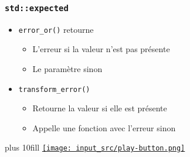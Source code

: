 \documentclass[C++.tex]{subfiles}
\begin{document}
\begin{frame}[fragile]
	\frametitle{\lstinline|std::expected|}
	\begin{itemize}
		\item \lstinline|error_or()| retourne
		\begin{itemize}
			\item L'erreur si la valeur n'est pas présente
			\item Le paramètre sinon
		\end{itemize}


		\item \lstinline|transform_error()|
		\begin{itemize}
			\item Retourne la valeur si elle est présente
			\item Appelle une fonction avec l'erreur sinon
		\end{itemize}
	\end{itemize}

	\vskip 10mm plus 10fill
	\hfill
	\href{https://godbolt.org/#z:OYLghAFBqd5QCxAYwPYBMCmBRdBLAF1QCcAaPECAMzwBtMA7AQwFtMQByARg9KtQYEAysib0QXACx8BBAKoBnTAAUAHpwAMvAFYTStJg1DIApACYAQuYukl9ZATwDKjdAGFUtAK4sGe1wAyeAyYAHI%2BAEaYxCCSAKykAA6oCoRODB7evnrJqY4CQSHhLFEx8baY9vkMQgRMxASZPn5cFVXptfUEhWGR0XoKdQ1N2a2DXT3FpRIAlLaoXsTI7BzmAMzByN5YANQma25Og8SYrPvYJhoAguub25h7B5iqiZgOmOjnlzdmGwxbXl2%2Bzcx2CwC%2B11u/3ujzcyFBRghPz%2BAKBBzEwBIhAQLCRUNRD2BhGiTCIxDx10G6BAIGer3enwOwQIpB2VJpCPBa2wO34qAgzJ2eBm3xMAHYrNcdkKqALHjyNCKpXsJd9pdKTgRFgwhftJVdpeKACJqnaVJSm8X69U7TXatkEakgLwhF5vAgfK3mMzhWje416y1ik2Q4Oi66ClhMYIQJU3VXKr3K6Xs2luhlEwSs1Oc85mx5G3moflxEVra3q1NoLwEWHAs0AOmixBIAH0SBBvQB5LyJBTemZ1g57MxmExxNwMf3loMhm6JhMG9VMGuoXku5AFvZxKxxQsQNAMQYOp25swANjZg9NNtvt6te2Td%2BfKcdHIIxDBOwWBEDT5fd6ph%2BhgKPwxAsBAqZRMAMYKHMJ40q4kHwVBTDIAA1q2wRKA00QQD%2B8E3gBxEkeOu5GhALqpMAIToDsyAIPU9EihKtqYFqxA6kBCyJK8xAHmWFgqoWglESR6p2px341n%2BS7iYaYYzpCT6pnS7qekyWYISAubcvm%2ByFnyEClrJNqqemHqMocWk5h%2BYJ5pgZhbpgDbAUeYEsK2zYdlQG6icpckyhAjlxoBb4oD%2BQ5uCOZgAGpiDsIAxVFZpmA2ABuYheJgsYpf6E5TqOpnquamBidp1a1sC9betgxAnIsiXJdVw6OU29UdteBw1UVBXThWAahnOHBzLQnBxLwfgcFopCoJwbjWNYbILEshK/DwpAEJoI1zOhIBxBo%2BicJIk3bbNnC8AoICHVt00jaQcCwEgzxvKuZAUBA9TAAoyiGJUQgIKgADuU0bWgLCJHQpLpL9IS0ADwNTTN4OQ/QMTfcwfaAyyKN0NEoSsCsvC42jPbCIDINnS9yBXMQ30XaQ1O1PgU28PwggiGI7BSDIgiKCo6h3aQuitAYRgoItlj6HgERXZAcyoIk1RXRwAC0VIGaYljWL8OyqwA6mItB6/rzzAXrrzoIYjjIJdK3LAMjrBLD/0U6DvBA8QTCJJwPCjeNp1C3NHDYKor1kjsqgABznqr56SDswDIJuEAfi66GDhAC3a1LOy4IQJAjmsXAzLwt1aDMcwIKcWAxLGpB7QdR0cCdpBI7wweXddm3bZXzdmIHM2dz3d19%2Bl0SpM4khAA%3D}{\texttt{[image: input\_src/play-button.png]}}
\end{frame}
\end{document}
